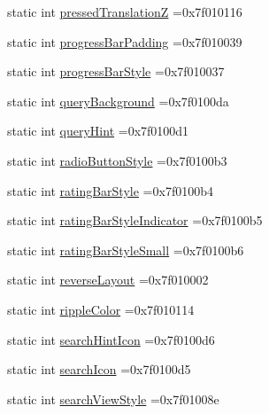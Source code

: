 \begin{DoxyCompactItemize}
static int \hyperlink{classandroid_1_1support_1_1graphics_1_1drawable_1_1R_1_1attr_a8f73ab043faed5a5f0177339bce27433}{pressed\+TranslationZ} =0x7f010116
\item 
static int \hyperlink{classandroid_1_1support_1_1graphics_1_1drawable_1_1R_1_1attr_a6a73a127b6301f534a66a8dd597193c5}{progress\+Bar\+Padding} =0x7f010039
\item 
static int \hyperlink{classandroid_1_1support_1_1graphics_1_1drawable_1_1R_1_1attr_a2f7cd4d4db93244689916e08f871ee44}{progress\+Bar\+Style} =0x7f010037
\item 
static int \hyperlink{classandroid_1_1support_1_1graphics_1_1drawable_1_1R_1_1attr_a28356977666d171563b8bd51654ed03b}{query\+Background} =0x7f0100da
\item 
static int \hyperlink{classandroid_1_1support_1_1graphics_1_1drawable_1_1R_1_1attr_aac93634d3122503051a0aba99d5962f8}{query\+Hint} =0x7f0100d1
\item 
static int \hyperlink{classandroid_1_1support_1_1graphics_1_1drawable_1_1R_1_1attr_afbc62a0aae46ef6d698c9c9e0297cfa0}{radio\+Button\+Style} =0x7f0100b3
\item 
static int \hyperlink{classandroid_1_1support_1_1graphics_1_1drawable_1_1R_1_1attr_ac462ba2799f135334e61fe837147e40e}{rating\+Bar\+Style} =0x7f0100b4
\item 
static int \hyperlink{classandroid_1_1support_1_1graphics_1_1drawable_1_1R_1_1attr_aa40ae836c1f8275dfe413649c38627c1}{rating\+Bar\+Style\+Indicator} =0x7f0100b5
\item 
static int \hyperlink{classandroid_1_1support_1_1graphics_1_1drawable_1_1R_1_1attr_a9a377772e9e0e2fb84f877c76f9fb7b0}{rating\+Bar\+Style\+Small} =0x7f0100b6
\item 
static int \hyperlink{classandroid_1_1support_1_1graphics_1_1drawable_1_1R_1_1attr_a96375d50fa728ae2213421f35b88cd9c}{reverse\+Layout} =0x7f010002
\item 
static int \hyperlink{classandroid_1_1support_1_1graphics_1_1drawable_1_1R_1_1attr_a44a4ce730ff71c98d987d3fc4f964afe}{ripple\+Color} =0x7f010114
\item 
static int \hyperlink{classandroid_1_1support_1_1graphics_1_1drawable_1_1R_1_1attr_aa60143156f95fecfd422c4368f22fd0c}{search\+Hint\+Icon} =0x7f0100d6
\item 
static int \hyperlink{classandroid_1_1support_1_1graphics_1_1drawable_1_1R_1_1attr_ade659221d4dc6e71c19a6a8784b7fc5b}{search\+Icon} =0x7f0100d5
\item 
static int \hyperlink{classandroid_1_1support_1_1graphics_1_1drawable_1_1R_1_1attr_a0d4f58b04a5775486b496ca0941bf80c}{search\+View\+Style} =0x7f01008e

\end{DoxyCompactItemize}
